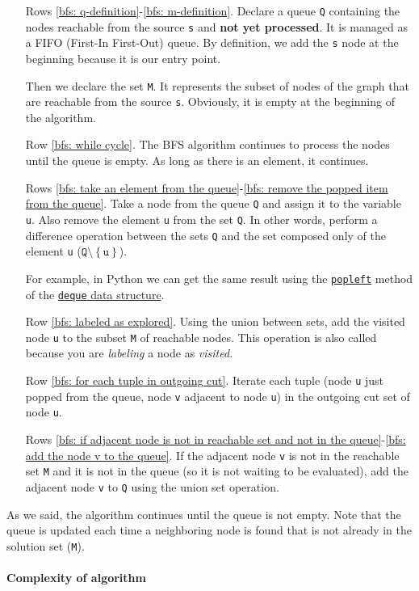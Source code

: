 \begin{itemize}
    \item[Rows \ref{bfs: q-definition}-\ref{bfs: m-definition}.] Declare a queue \texttt{Q} containing the nodes reachable from the source \texttt{s} and \textbf{not yet processed}. It is managed as a FIFO (First-In First-Out) queue. By definition, we add the \texttt{s} node at the beginning because it is our entry point.
    
    Then we declare the set \texttt{M}. It represents the subset of nodes of the graph that are reachable from the source \texttt{s}. Obviously, it is empty at the beginning of the algorithm.

    \item[Row \ref{bfs: while cycle}.] The BFS algorithm continues to process the nodes until the queue is empty. As long as there is an element, it continues.
    
    \item[Rows \ref{bfs: take an element from the queue}-\ref{bfs: remove the popped item from the queue}.] Take a node from the queue \texttt{Q} and assign it to the variable \texttt{u}. Also remove the element \texttt{u} from the set \texttt{Q}. In other words, perform a difference operation between the sets \texttt{Q} and the set composed only of the element \texttt{u} ($\texttt{Q} \setminus \left\{\texttt{u}\right\}$).
    
    For example, in Python we can get the same result using the \href{https://docs.python.org/3/library/collections.html#collections.deque.popleft}{\texttt{popleft}} method of the \href{https://docs.python.org/3/tutorial/datastructures.html#using-lists-as-queues}{\texttt{deque} data structure}.

    \item[Row \ref{bfs: labeled as explored}.] Using the union between sets, add the visited node \texttt{u} to the subset \texttt{M} of reachable nodes. This operation is also called  because you are \emph{labeling} a node as \emph{visited}.
    
    \item[Row \ref{bfs: for each tuple in outgoing cut}.] Iterate each tuple (node \texttt{u} just popped from the queue, node \texttt{v} adjacent to node \texttt{u}) in the outgoing cut set of node \texttt{u}.
    
    \item[Rows \ref{bfs: if adjacent node is not in reachable set and not in the queue}-\ref{bfs: add the node v to the queue}.] If the adjacent node \texttt{v} is not in the reachable set \texttt{M} and it is not in the queue (so it is not waiting to be evaluated), add the adjacent node \texttt{v} to \texttt{Q} using the union set operation.
\end{itemize}
As we said, the algorithm continues until the queue is not empty. Note that the queue is updated each time a neighboring node is found that is not already in the solution set (\texttt{M}).

\newpage

\paragraph{Complexity of algorithm}